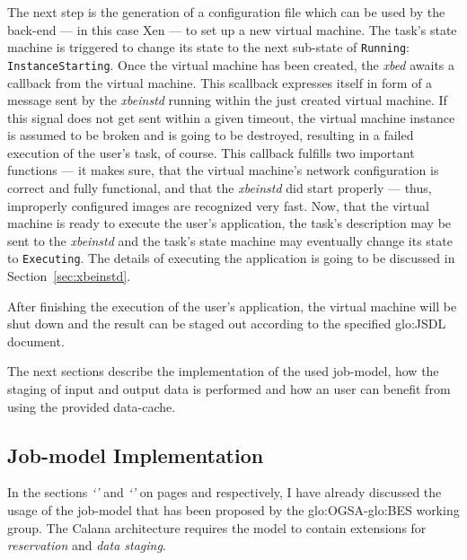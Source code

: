 The next step is the generation  of a configuration file which can be used
by the back-end --- in this case  Xen --- to set up a new virtual machine.
The task's  state machine  is triggered  to change its  state to  the next
sub-state   of  \texttt{Running}:  \texttt{InstanceStarting}.    Once  the
virtual machine has  been created, the \emph{xbed} awaits  a callback from
the virtual machine.  This scallback expresses itself in form of a message
sent  by  the \emph{xbeinstd}  running  within  the  just created  virtual
machine.  If  this signal does  not get sent  within a given  timeout, the
virtual  machine instance  is assumed  to  be broken  and is  going to  be
destroyed, resulting in a failed  execution of the user's task, of course.
This callback fulfills two important functions --- it makes sure, that the
virtual machine's  network configuration is correct  and fully functional,
and  that the  \emph{xbeinstd}  did start  properly  --- thus,  improperly
configured images are recognized very fast.  Now, that the virtual machine
is ready to execute the  user's application, the task's description may be
sent to  the \emph{xbeinstd} and  the task's state machine  may eventually
change  its state  to  \texttt{Executing}. The  details  of executing  the
application is going to be discussed in Section~\ref{sec:xbeinstd}.

After  finishing the  execution  of the  user's  application, the  virtual
machine will  be shut down and the  result can be staged  out according to
the specified \gls{glo:JSDL} document.

\bigskip

The next sections  describe the implementation of the  used job-model, how
the staging  of input  and output data  is performed  and how an  user can
benefit from using the provided data-cache.

\subsection{Job-model Implementation}
\label{sec:xbed:job-model}

In     the     sections    \emph{`'}     and
\emph{`'}               on               pages
\pageref{sec:fundamentals:bes}       and      \pageref{sec:calana-support}
respectively, I have already discussed the usage of the job-model that has
been  proposed  by the  \gls{glo:OGSA}-\gls{glo:BES}  working group.   The
Calana  architecture   requires  the  model  to   contain  extensions  for
\emph{reservation} and \emph{data staging}.

